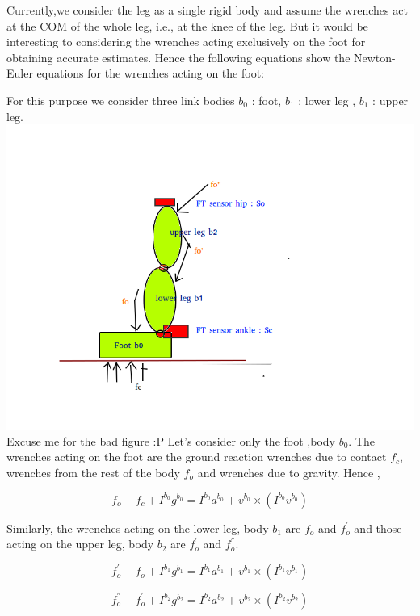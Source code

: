 \documentclass[letterpaper, 10pt, conference]{ieeeconf}      %
\begin{document}
Currently,we consider the leg as a single rigid body and assume the wrenches act at the COM of the whole leg, i.e., at the knee of the leg. But it would be interesting to considering the wrenches acting exclusively  on the foot for obtaining accurate estimates. Hence the following equations show the Newton-Euler equations for the wrenches acting on the foot:



For this purpose we consider three link bodies $b_{0}$ : foot,  $b_{1}$ : lower leg , $b_{1}$ : upper leg.
\linebreak
\includegraphics[scale = 0.25]{legmodel}
\linebreak
Excuse me for the bad figure :P
\linebreak
Let's consider only the foot ,body $b_{0}$. The wrenches acting on the foot are the ground reaction wrenches due to contact $f_{c}$, wrenches from the  rest of the body $f_{o}$ and wrenches due to gravity. Hence ,

$$ f_{o} - f_{c}  + I^{b_{0}}g^{b_{0}} = I^{b_{0}}a^{b_{0}} + v^{b_{0}}\times (I^{b_{0}}v^{b_{0}}) $$

Similarly, the wrenches acting on the lower leg, body $b_{1}$ are $f_{o}$ and $f_{o}^{'}$ and those acting on the upper leg, body $b_{2}$ are $f_{o}^{'}$ and $f_{o}^{''}$.

$$ f_{o}^{'} - f_{o}  + I^{b_{1}}g^{b_{1}} = I^{b_{1}}a^{b_{1}} + v^{b_{1}}\times (I^{b_{1}}v^{b_{1}}) $$

$$ f_{o}^{''} - f_{o}^{'}  + I^{b_{2}}g^{b_{2}} = I^{b_{2}}a^{b_{2}} + v^{b_{2}}\times (I^{b_{2}}v^{b_{2}}) $$
\end{document}

